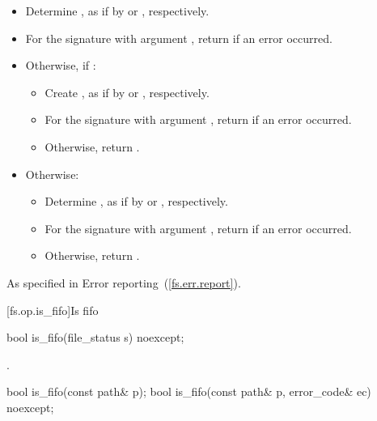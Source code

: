 \begin{itemdescr}
\pnum
\effects
\begin{itemize}
\item Determine ,
   as if by  or , respectively.
\item For the signature with argument ,
   return  if an error occurred.
\item Otherwise, if :
  \begin{itemize}
  \item Create ,
     as if by  or
     , respectively.
  \item For the signature with argument ,
     return  if an error occurred.
  \item Otherwise, return .
  \end{itemize}
\item
Otherwise:
  \begin{itemize}
  \item Determine ,
    as if by  or , respectively.
  \item For the signature with argument ,
    return  if an error occurred.
  \item Otherwise, return .
  \end{itemize}
\end{itemize}

\pnum
\throws As specified in Error reporting~(\ref{fs.err.report}).
\end{itemdescr}


[fs.op.is_fifo]{Is fifo}

%
\begin{itemdecl}
bool is_fifo(file_status s) noexcept;
\end{itemdecl}

\begin{itemdescr}
\pnum
\returns {}.
\end{itemdescr}


%
\begin{itemdecl}
bool is_fifo(const path& p);
bool is_fifo(const path& p, error_code& ec) noexcept;
\end{itemdecl}

